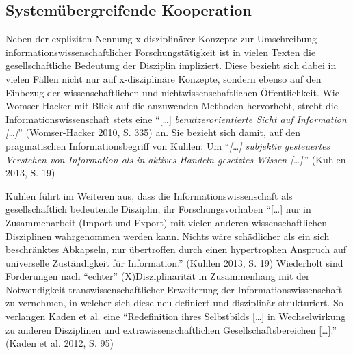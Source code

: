 \documentclass[a4paper,
fontsize=11pt,
oneside,
numbers=noperiodatend,
parskip=half-,
bibliography=totoc,
final
]{scrartcl}
\begin{document}
\subsection*{Systemübergreifende
Kooperation}\label{systemuxfcbergreifende-kooperation}

Neben der expliziten Nennung x-disziplinärer Konzepte zur Umschreibung
informationswissenschaftlicher Forschungstätigkeit ist in vielen Texten
die gesellschaftliche Bedeutung der Disziplin impliziert. Diese bezieht
sich dabei in vielen Fällen nicht nur auf x-disziplinäre Konzepte,
sondern ebenso auf den Einbezug der wissenschaftlichen und
nichtwissenschaftlichen Öffentlichkeit. Wie Womser-Hacker mit Blick auf
die anzuwenden Methoden hervorhebt, strebt die Informationswissenschaft
stets eine \enquote{{[}\ldots{}{]} \emph{benutzerorientierte Sicht auf
Information {[}\ldots{}{]}}} (Womser-Hacker 2010, S. 335) an. Sie
bezieht sich damit, auf den pragmatischen Informationsbegriff von
Kuhlen: Um \enquote{\emph{{[}\ldots{}{]} subjektiv gesteuertes Verstehen
von Information als in aktives Handeln gesetztes Wissen
{[}\ldots{}{]}}.} (Kuhlen 2013, S. 19)

Kuhlen führt im Weiteren aus, dass die Informationswissenschaft als
gesellschaftlich bedeutende Disziplin, ihr Forschungsvorhaben
\enquote{{[}\ldots{}{]} nur in Zusammenarbeit (Import und Export) mit
vielen anderen wissenschaftlichen Disziplinen wahrgenommen werden kann.
Nichts wäre schädlicher als ein sich beschränktes Abkapseln, nur
übertroffen durch einen hypertrophen Anspruch auf universelle
Zuständigkeit für Information.} (Kuhlen 2013, S. 19) Wiederholt sind
Forderungen nach \enquote{echter} (X)Disziplinarität in Zusammenhang mit
der Notwendigkeit transwissenschaftlicher Erweiterung der
Informationswissenschaft zu vernehmen, in welcher sich diese neu
definiert und disziplinär strukturiert. So verlangen Kaden et al. eine
\enquote{Redefinition ihres Selbstbilds {[}\ldots{}{]} in Wechselwirkung
zu anderen Disziplinen und extrawissenschaftlichen
Gesellschaftsbereichen {[}\ldots{}{]}.} (Kaden et al. 2012, S. 95)
\end{document}
